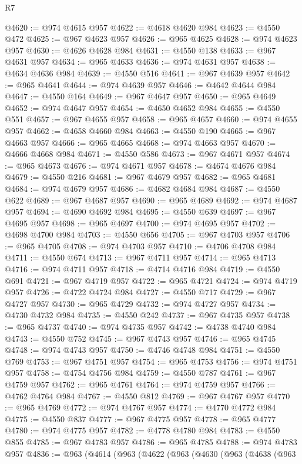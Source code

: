 \begin{lexlean}{R7}
\begin{coremodule}
@4620 := @974 @4615 @957
@4622 := @4618 @4620 @984
@4623 := @4550 @472
@4625 := @967 @4623 @957
@4626 := @965 @4625
@4628 := @974 @4623 @957
@4630 := @4626 @4628 @984
@4631 := @4550 @138
@4633 := @967 @4631 @957
@4634 := @965 @4633
@4636 := @974 @4631 @957
@4638 := @4634 @4636 @984
@4639 := @4550 @516
@4641 := @967 @4639 @957
@4642 := @965 @4641
@4644 := @974 @4639 @957
@4646 := @4642 @4644 @984
@4647 := @4550 @164
@4649 := @967 @4647 @957
@4650 := @965 @4649
@4652 := @974 @4647 @957
@4654 := @4650 @4652 @984
@4655 := @4550 @551
@4657 := @967 @4655 @957
@4658 := @965 @4657
@4660 := @974 @4655 @957
@4662 := @4658 @4660 @984
@4663 := @4550 @190
@4665 := @967 @4663 @957
@4666 := @965 @4665
@4668 := @974 @4663 @957
@4670 := @4666 @4668 @984
@4671 := @4550 @586
@4673 := @967 @4671 @957
@4674 := @965 @4673
@4676 := @974 @4671 @957
@4678 := @4674 @4676 @984
@4679 := @4550 @216
@4681 := @967 @4679 @957
@4682 := @965 @4681
@4684 := @974 @4679 @957
@4686 := @4682 @4684 @984
@4687 := @4550 @622
@4689 := @967 @4687 @957
@4690 := @965 @4689
@4692 := @974 @4687 @957
@4694 := @4690 @4692 @984
@4695 := @4550 @639
@4697 := @967 @4695 @957
@4698 := @965 @4697
@4700 := @974 @4695 @957
@4702 := @4698 @4700 @984
@4703 := @4550 @656
@4705 := @967 @4703 @957
@4706 := @965 @4705
@4708 := @974 @4703 @957
@4710 := @4706 @4708 @984
@4711 := @4550 @674
@4713 := @967 @4711 @957
@4714 := @965 @4713
@4716 := @974 @4711 @957
@4718 := @4714 @4716 @984
@4719 := @4550 @691
@4721 := @967 @4719 @957
@4722 := @965 @4721
@4724 := @974 @4719 @957
@4726 := @4722 @4724 @984
@4727 := @4550 @717
@4729 := @967 @4727 @957
@4730 := @965 @4729
@4732 := @974 @4727 @957
@4734 := @4730 @4732 @984
@4735 := @4550 @242
@4737 := @967 @4735 @957
@4738 := @965 @4737
@4740 := @974 @4735 @957
@4742 := @4738 @4740 @984
@4743 := @4550 @752
@4745 := @967 @4743 @957
@4746 := @965 @4745
@4748 := @974 @4743 @957
@4750 := @4746 @4748 @984
@4751 := @4550 @769
@4753 := @967 @4751 @957
@4754 := @965 @4753
@4756 := @974 @4751 @957
@4758 := @4754 @4756 @984
@4759 := @4550 @787
@4761 := @967 @4759 @957
@4762 := @965 @4761
@4764 := @974 @4759 @957
@4766 := @4762 @4764 @984
@4767 := @4550 @812
@4769 := @967 @4767 @957
@4770 := @965 @4769
@4772 := @974 @4767 @957
@4774 := @4770 @4772 @984
@4775 := @4550 @837
@4777 := @967 @4775 @957
@4778 := @965 @4777
@4780 := @974 @4775 @957
@4782 := @4778 @4780 @984
@4783 := @4550 @855
@4785 := @967 @4783 @957
@4786 := @965 @4785
@4788 := @974 @4783 @957
@4836 := @963
    (@4614
      (@963
        (@4622
          (@963
            (@4630
              (@963
                (@4638
                  (@963

\end{coremodule}
\end{lexlean}
